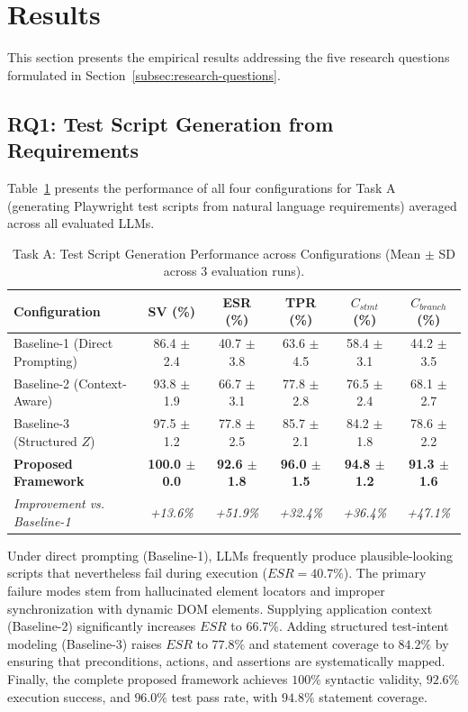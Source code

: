 \documentclass[pdflatex,sn-mathphys-num]{sn-jnl}
\begin{document}
\section{Results}
\label{sec:results}

This section presents the empirical results addressing the five research
questions formulated in Section~\ref{subsec:research-questions}.

\subsection{RQ1: Test Script Generation from Requirements}
\label{subsec:rq1-results}

Table~\ref{tab:generation-results} presents the performance of all four configurations
for Task A (generating Playwright test scripts from natural language requirements)
averaged across all evaluated LLMs.

\begin{table}[t]
\centering
\caption{Task A: Test Script Generation Performance across Configurations (Mean $\pm$ SD across 3 evaluation runs).}
\label{tab:generation-results}
\small
\begin{tabular}{lccccc}
\toprule
\textbf{Configuration} &
\textbf{SV (\%)} &
\textbf{ESR (\%)} &
\textbf{TPR (\%)} &
\textbf{$C_{stmt}$ (\%)} &
\textbf{$C_{branch}$ (\%)} \\
\midrule
Baseline-1 (Direct Prompting) & 86.4 $\pm$ 2.4 & 40.7 $\pm$ 3.8 & 63.6 $\pm$ 4.5 & 58.4 $\pm$ 3.1 & 44.2 $\pm$ 3.5 \\
Baseline-2 (Context-Aware) & 93.8 $\pm$ 1.9 & 66.7 $\pm$ 3.1 & 77.8 $\pm$ 2.8 & 76.5 $\pm$ 2.4 & 68.1 $\pm$ 2.7 \\
Baseline-3 (Structured $Z$) & 97.5 $\pm$ 1.2 & 77.8 $\pm$ 2.5 & 85.7 $\pm$ 2.1 & 84.2 $\pm$ 1.8 & 78.6 $\pm$ 2.2 \\
\textbf{Proposed Framework} & \textbf{100.0 $\pm$ 0.0} & \textbf{92.6 $\pm$ 1.8} & \textbf{96.0 $\pm$ 1.5} & \textbf{94.8 $\pm$ 1.2} & \textbf{91.3 $\pm$ 1.6} \\
\midrule
\textit{Improvement vs. Baseline-1} & \textit{+13.6\%} & \textit{+51.9\%} & \textit{+32.4\%} & \textit{+36.4\%} & \textit{+47.1\%} \\
\bottomrule
\end{tabular}
\end{table}

Under direct prompting (Baseline-1), LLMs frequently produce plausible-looking
scripts that nevertheless fail during execution ($ESR = 40.7\%$). The primary failure
modes stem from hallucinated element locators and improper synchronization with dynamic
DOM elements. Supplying application context (Baseline-2) significantly increases $ESR$
to $66.7\%$. Adding structured test-intent modeling (Baseline-3) raises $ESR$ to $77.8\%$
and statement coverage to $84.2\%$ by ensuring that preconditions, actions, and
assertions are systematically mapped. Finally, the complete proposed framework achieves
$100\%$ syntactic validity, $92.6\%$ execution success, and $96.0\%$ test pass rate,
with $94.8\%$ statement coverage.
\end{document}
